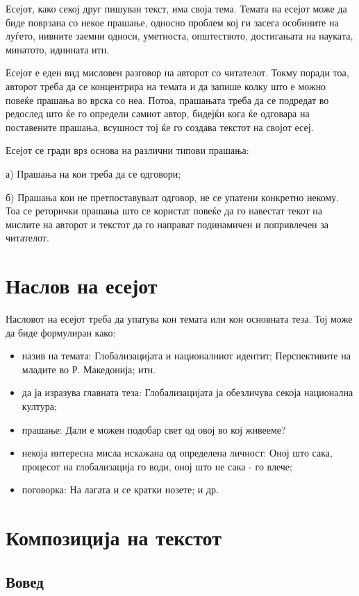 \documentclass[12pt,a4paper]{article}
\begin{document}
Есејот, како секој друг пишуван текст, има своја тема. Темата на есејот може да
биде поврзана со некое прашање, однос­но проблем кој ги засега особините на
луѓето, нивните заем­ни односи, уметноста, општеството, достигањата на наука­та,
минатото, иднината итн.

Есејот е еден вид мисловен разговор на авторот со чита­телот. Токму поради тоа,
авторот треба да се концентри­ра на темата и да запише колку што е можно повеќе
пра­шања во врска со неа. Потоа, прашањата треба да се под­редат во редослед што
ќе го определи самиот автор, бидејќи кога ќе одговара на поставените прашања,
всушност тој ќе го создава текстот на својот есеј.

Есејот се гради врз основа на различни типови прашања: 

а) Прашања на кои треба да се одговори;
 
б) Прашања кои не претпоставуваат одговор, не се упатени конкретно   некому. Тоа
се реторички прашања што се користат повеќе да го навестат текот на мислите на
ав­торот и текстот да го направат подинамичен и попривлечен за читателот.

\section{Наслов на есејот} 

Насловот на есејот треба да упатува кон темата или кон основната теза. Тој мо­же
да биде формулиран како:
\begin{itemize}
  \item назив на темата: Глобализацијата и националниот иден­тит; Перспективите
  на младите во Р. Македонија; итн.
  \item да ја изразува главната теза: Глобализацијата ја обез­личува секоја
  национална култура;
  \item прашање: Дали е можен подобар свет од овој во кој живееме?
  \item некоја интересна мисла искажана од определена лич­ност: Оној што сака,
  процесот на глобализација го води, оној што не сака - го влече;
  \item поговорка: На лагата и се кратки нозете; и др. 
\end{itemize}

\section{Композиција на текстот} 

\subsection{Вовед} 
\end{document}
